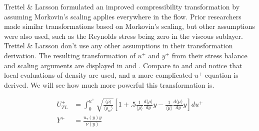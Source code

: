 Trettel \& Larsson formulated an improved compressibility transformation \cite{trettelMeanVelocityScaling2016} by assuming Morkovin's scaling applies everywhere in the flow. Prior researchers made similar transformations based on Morkovin's scaling, but other assumptions were also used, such as the Reynolds stress being zero in the viscous sublayer. Trettel \& Larsson don't use any other assumptions in their transformation derivation. The resulting transformation of $u^+$ and $y^+$ from their stress balance and scaling arguments are displayed in  and . Compare to  and  and notice that local evaluations of density are used, and a more complicated $u^+$ equation is derived. We will see how much more powerful this transformation is.

\begin{align} %
  U^+_{TL} & = \int^{u^+}_0 \sqrt{\frac{\langle\rho\rangle}{\langle\rho_w\rangle}} \left[1 + .5\frac{1}{\langle \rho \rangle} \frac{d \langle \rho \rangle}{dy} y-\frac{1}{\langle \mu \rangle}\frac{d \langle \mu \rangle}{dy}y \right]du^+ \label{eqn:tl1} \\[0.5ex]
  Y^+      & = \frac{u_\tau(y) y}{\nu(y)} \label{eqn:tl2}
\end{align}